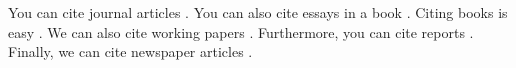 \documentclass{article}
\begin{document}
You can cite journal articles \citep{tomz2013public}. You can also cite essays in a book \citep{Golumbic2004}. Citing books is easy \citep{Grandstrand2004}. We can also cite working papers \citep{Norton2014}. Furthermore, you can cite reports \citep{WorldBank}. Finally, we can cite newspaper articles \citep{Polgreen2007}.



\end{document}
